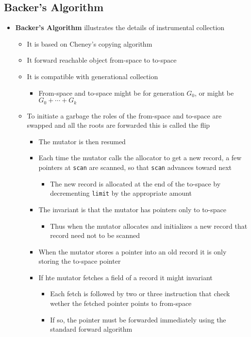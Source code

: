 \documentclass[11pt]{article}
\begin{document}
\subsection{Backer's Algorithm}
\label{sec:org6716edf}
\begin{itemize}
\item \textbf{Backer's Algorithm} illustrates the details of instrumental collection
\begin{itemize}
\item It is based on Cheney's copying algorithm
\item It forward reachable object from-space to to-space
\item It is compatible with generational collection
\begin{itemize}
\item From-space and to-space might be for generation \(G_0\), or might be \(G_0 + \cdots + G_k\)
\end{itemize}
\item To initiate a garbage the roles of the from-space and to-space are swapped and all the roots are forwarded this is called the flip 
\begin{itemize}
\item The mutator is then resumed
\item Each time the mutator calls the allocator to get a new record, a few pointers at \texttt{scan} are scanned, so that \texttt{scan} advances toward next
\begin{itemize}
\item The new record is allocated at the end of the to-space by decrementing \texttt{limit} by the appropriate amount
\end{itemize}
\item The invariant is that the mutator has pointers only to to-space
\begin{itemize}
\item Thus when the mutator allocates and initializes a new record that record need not to be scanned
\end{itemize}
\item When the mutator stores a pointer into an old record it is only storing the to-space pointer
\item If hte mutator fetches a field of a record it might invariant
\begin{itemize}
\item Each fetch is followed by two or three instruction that check wether the fetched pointer points to from-space
\item If so, the pointer must be forwarded immediately using the standard forward algorithm

\end{itemize}
\end{itemize}
\end{itemize}
\end{itemize}
\end{document}
